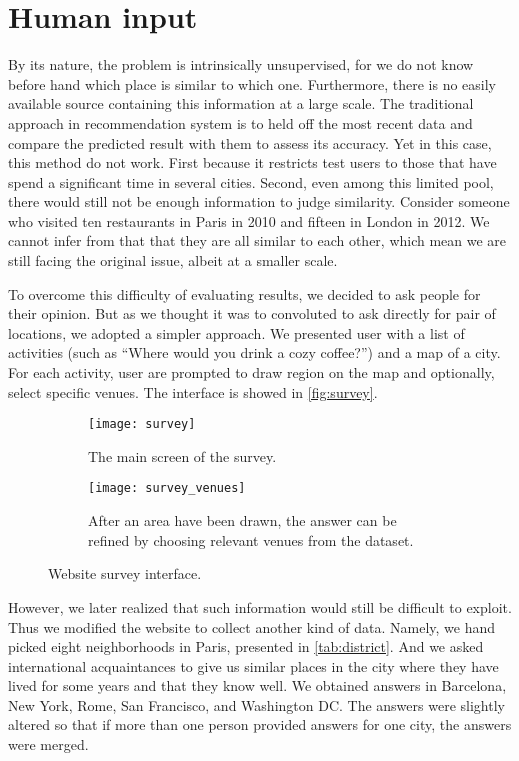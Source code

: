 \section{Human input}
\label{sec:user-study}

By its nature, the problem is intrinsically unsupervised, for we do not know
before hand which place is similar to which one. Furthermore, there is no
easily available source containing this information at a large scale. The
traditional approach in recommendation system is to held off the most recent
data and compare the predicted result with them to assess its accuracy.  Yet
in this case, this method do not work. First because it restricts test users
to those that have spend a significant time in several cities. Second, even
among this limited pool, there would still not be enough information to
judge similarity. Consider someone who visited ten restaurants in Paris in
2010 and fifteen in London in 2012. We cannot infer from that that they are
all similar to each other, which mean we are still facing the original issue,
albeit at a smaller scale.

To overcome this difficulty of evaluating results, we decided to ask people
for their opinion. But as we thought it was to convoluted to ask directly for
pair of locations, we adopted a simpler approach. We presented user with a
list of activities (such as \enquote{Where would you drink a cozy coffee?}) and
a map of a city. For each activity, user are prompted to draw region on the
map and optionally, select specific venues. The interface is showed in
\autoref{fig:survey}.

\begin{figure}[hbtp]
    \centering
    \begin{subfigure}[b]{\textwidth}
        \texttt{[image: survey]}
        \caption{The main screen of the survey.}
    \end{subfigure}

    \begin{subfigure}[b]{\textwidth}
        \texttt{[image: survey\_venues]}
        \caption{After an area have been drawn, the answer can be refined by
        choosing relevant venues from the dataset.}
    \end{subfigure}
    \caption{Website survey interface.\label{fig:survey}}
\end{figure}

However, we later realized that such information would still be difficult to
exploit. Thus we modified the website to collect another kind of data. Namely,
we hand picked eight neighborhoods in Paris, presented in
\autoref{tab:district}. And we asked international acquaintances to give us
similar places in the city where they have lived for some years and that they
know well. We obtained answers in Barcelona, New York, Rome, San
Francisco, and Washington DC. The answers were slightly altered so that if more
than one person provided answers for one city, the answers were merged.

